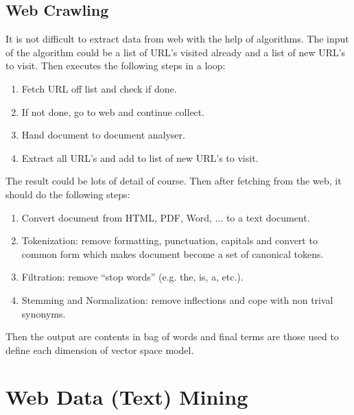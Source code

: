 \documentclass[sigconf]{acmart}
\begin{document}
\subsection{Web Crawling}

It is not difficult to extract data from web with the help of algorithms. The input of the algorithm could be a list of URL's visited already and a list of new URL's to visit. Then executes the following steps in a loop:
\begin{enumerate}
\item Fetch URL off list and check if done.
\item If not done, go to web and continue collect.
\item Hand document to document analyser.
\item Extract all URL's and add to list of new URL's to visit.
\end{enumerate}
The result could be lots of detail of course. Then after fetching from the web, it should do the following steps:
\begin{enumerate}
\item Convert document from HTML, PDF, Word, $\ldots$ to a text document.
\item Tokenization: remove formatting, punctuation, capitals and convert to common form which makes document become a set of canonical tokens.
\item Filtration: remove ``stop words'' (e.g. the, is, a, etc.).
\item Stemming and Normalization: remove inflections and cope with non trival synonyms.
\end{enumerate}
Then the output are contents in bag of words and final terms are those used to define each dimension of vector space model.

\section{Web Data (Text) Mining}
\end{document}
